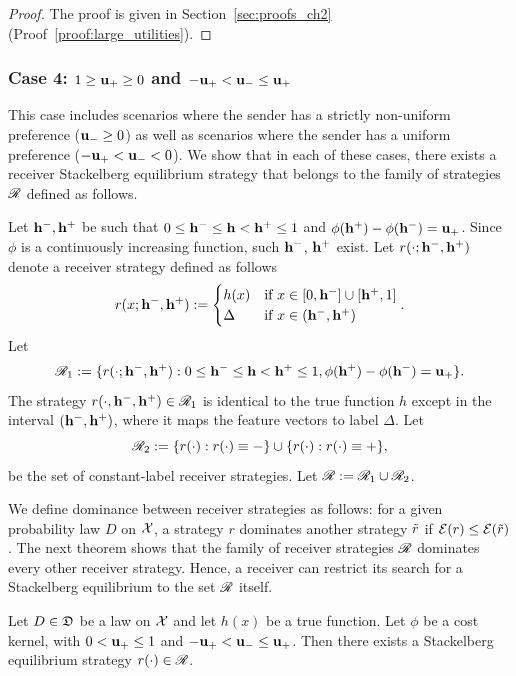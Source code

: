 \begin{proof} The proof is given in Section~\ref{sec:proofs_ch2} (Proof~\ref{proof:large_utilities}).
\end{proof}


\subsubsection{Case 4: $1 \geq \mathbf{u_+} \geq 0$ and $-\mathbf{u_+} < \mathbf{u_-} \leq \mathbf{u_+}$}
This case includes scenarios where the sender has a strictly non-uniform preference ($\mathbf{u_-} \geq 0$) as well as scenarios where the sender has a uniform preference ($-\mathbf{u_+} < \mathbf{u_-} < 0$).
We show that in each of these cases, there exists a receiver Stackelberg equilibrium strategy that belongs to the family of strategies $\mathscr{R}$ defined as follows.

Let $\mathbf{h^{-}},\mathbf{h^{+}}$ be such that $0 \leq \mathbf{h^{-}} \leq \mathbf{h} < \mathbf{h^{+}} \leq 1$ and $\phi(\mathbf{h^{+}}) - \phi(\mathbf{h^{-}}) = \mathbf{u_+}$. Since $\phi$ is a continuously increasing function, such $\mathbf{h^{-}}$, $\mathbf{h^{+}}$ exist. Let $r(\cdot;\mathbf{h^{-}},\mathbf{h^{+}})$ denote a receiver strategy defined as follows
	\begin{equation*}\label{eqn:simple strategies}
		r(x;\mathbf{h^{-}},\mathbf{h^{+}}) := \begin{cases}
			h(x) & \text{if } x \in [0,\mathbf{h^{-}}] \cup [\mathbf{h^{+}},1] \\
			\Delta & \text{if } x \in (\mathbf{h^{-}},\mathbf{h^{+}})
		\end{cases}.
	\end{equation*}
Let $$\mathscr{R}_1 := \{r(\cdot;\mathbf{h^{-}},\mathbf{h^{+}}): 0 \leq \mathbf{h^{-}} \leq \mathbf{h} < \mathbf{h^{+}} \leq 1, \phi(\mathbf{h^{+}}) - \phi(\mathbf{h^{-}}) = \mathbf{u_+}\}.$$
The strategy $r(\cdot,\mathbf{h^{-}},\mathbf{h^{+}}) \in \mathscr{R}_1$ is identical to the true function $h$ except in the interval $(\mathbf{h^{-}},\mathbf{h^{+}})$, where it maps the feature vectors to label $\Delta$.
Let$$\mathscr{R}_2 := \{r(\cdot): r(\cdot) \equiv \mathbf{-}\} \cup \{r(\cdot): r(\cdot) \equiv \mathbf{+}\},$$  be the set of constant-label receiver strategies. Let $\mathscr{R} := \mathscr{R}_1 \cup \mathscr{R}_2$.


We define dominance between receiver strategies as follows: for a given probability law $D$ on $\mathcal{X}$, a strategy $r$ dominates another strategy $\tilde{r}$ if $\mathcal{E}(r) \leq \mathcal{E}(\tilde{r})$. The next theorem shows that the family of receiver strategies $\mathscr{R}$ dominates every other receiver strategy. Hence, a receiver can restrict its search for a Stackelberg equilibrium to the set $\mathscr{R}$ itself.
\begin{thm}\label{thm:Deterministic Stackelberg equilibrium strategy} Let $D \in \mathfrak{D}$ be a law on $\mathcal{X}$ and let $h(x)$ be a true function. Let $\phi$ be a cost kernel, with $0 < \mathbf{u_+} \le 1$ and $-\mathbf{u_+} < \mathbf{u_-} \le \mathbf{u_+}$. Then there exists a Stackelberg equilibrium strategy $r(\cdot) \in \mathscr{R}$.
\end{thm}



